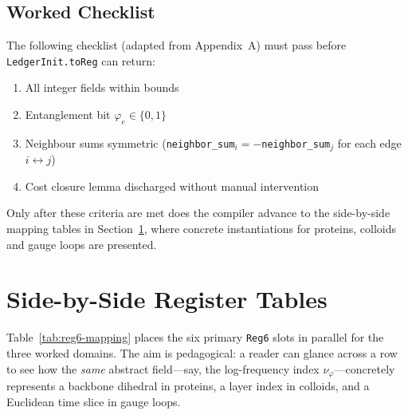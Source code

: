 \documentclass[11pt,a4paper]{article}
\begin{document}
\subsection{Worked Checklist}
\label{subsec:checklist}
The following checklist (adapted from Appendix~A) must pass before
\texttt{LedgerInit.toReg} can return:
\begin{enumerate}
  \item All integer fields within bounds \checkmark
  \item Entanglement bit $\varphi_{e}\in\{0,1\}$ \checkmark
  \item Neighbour sums symmetric (\texttt{neighbor\_sum}$_i = -$\texttt{neighbor\_sum}$_j$ for each edge $i\leftrightarrow j$) \checkmark
  \item Cost closure lemma discharged without manual intervention \checkmark
\end{enumerate}

Only after these criteria are met does the compiler advance to the
side-by-side mapping tables in Section~\ref{sec:tables}, where concrete
instantiations for proteins, colloids and gauge loops are presented.


\section{Side-by-Side Register Tables}
\label{sec:tables}

\noindent
Table~\ref{tab:reg6-mapping} places the six primary \texttt{Reg6} slots
in parallel for the three worked domains.  The aim is pedagogical:
a reader can glance across a row to see how the \emph{same} abstract
field---say, the log-frequency index $\nu_{\varphi}$---concretely
represents a backbone dihedral in proteins, a layer index in colloids,
and a Euclidean time slice in gauge loops.
\end{document}
